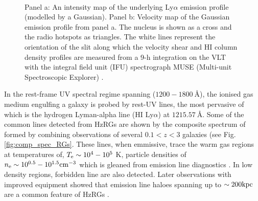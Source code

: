 \documentclass[10pt,a4paper]{article}
\begin{document}
\begin{figure}[!ht]
 \centering
 \\
 \caption[Intensity and velocity map from \citet{swinbank2015}]{Panel a: An intensity map of the underlying Ly$\alpha$ emission profile (modelled by a Gaussian). Panel b: Velocity map of the Gaussian emission profile from panel a. The nucleus is shown as a cross and the radio hotspots as triangles. The white lines represent the orientation of the slit along which the velocity shear and HI column density profiles are measured from a 9-h integration on the VLT with the integral field unit (IFU) spectrograph MUSE (Multi-unit Spectroscopic Explorer) \citet{swinbank2015}.}
 \label{fig:TNJ1338-Swinbank2015}
\end{figure}

In the rest-frame UV spectral regime spanning ($1200 - 1800~\text{\AA}$), the ionised gas medium engulfing a galaxy is probed by rest-UV lines, the most pervasive of which is the hydrogen Lyman-alpha line (HI Ly$\alpha$) at $1215.57~\text{\AA}$. Some of the common lines detected from HzRGs are shown by the composite spectrum of \citet{McCarthy1993} formed by combining observations of several $0.1 < z < 3$ galaxies (see Fig. \ref{fig:comp_spec_RGs}. These lines, when emmissive, trace the warm gas regions at temperatures of, $T_{\rm{e}} \sim 10^{4}-10^{5}$ K, particle densities of $n_{\rm{e}} \sim 10^{0.5} - 10^{1.5} \rm cm^{-3}$ which is gleaned from emission line diagnostics \citep{OsterbrockFerland2006}. In low density regions, forbidden line are also detected. Later observations with improved equipment showed that emission line haloes spanning up to $\sim200 \rm kpc$ are a common feature of HzRGs \citep{Reuland2003a}. 
\end{document}

